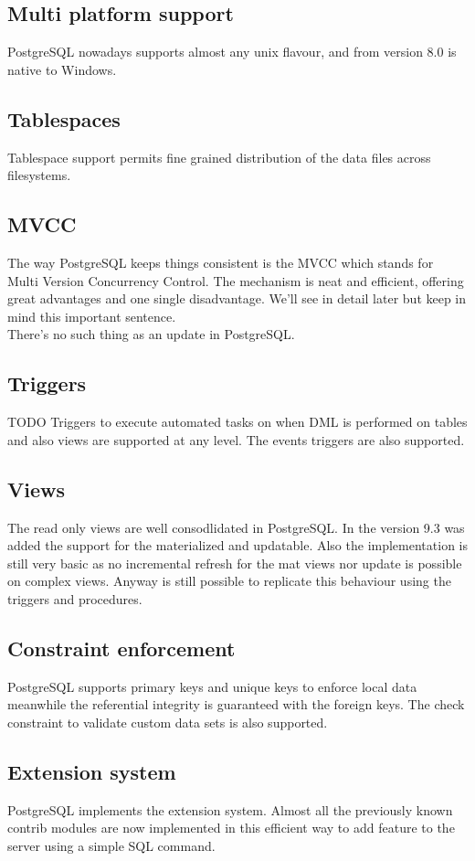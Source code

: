 \subsection{Multi platform support}
PostgreSQL nowadays supports almost any unix flavour, and from
version 8.0 is native to Windows.

\subsection{Tablespaces}
Tablespace support permits fine grained distribution of the data files across
filesystems.

\subsection{MVCC}
The way PostgreSQL keeps things consistent is the MVCC which stands for Multi
Version Concurrency Control. The mechanism is neat and efficient, offering
great advantages and one single disadvantage. We'll see in detail later but
keep in mind this important sentence. \\
There's no such thing as an update in PostgreSQL.

\subsection{Triggers} TODO
Triggers to execute automated tasks on when DML is performed on tables and also
views are supported at any level. The events triggers are also supported.

\subsection{Views}
The read only views are well consodlidated in PostgreSQL.
In the version 9.3 was added the support for the materialized and updatable.
Also the implementation is still very basic as no incremental refresh for the
mat views nor update is possible on complex views. Anyway is still possible to
replicate this behaviour using the triggers and procedures.

\subsection{Constraint enforcement}
PostgreSQL supports primary keys and unique keys to enforce local data meanwhile
the referential integrity is guaranteed with the foreign keys.
The check constraint to validate custom data sets is also supported.

\subsection{Extension system}
PostgreSQL implements the extension system. Almost all the previously known
contrib modules are now implemented in this efficient way to add feature to the
server using a simple SQL command.
